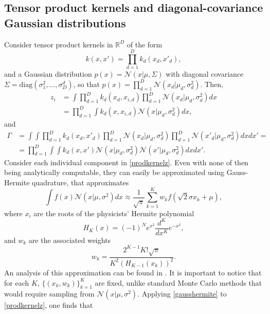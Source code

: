\subsection{Tensor product kernels and diagonal-covariance Gaussian distributions}\label{tensorprodbmc}
Consider tensor product kernels in $\mathbb{R}^D$ of the form
\begin{equation}
 k(x,x') = \prod_{d=1}^D k_d(x_d,x'_d),
\end{equation}
and a Gaussian distribution $p(x) = \mathcal{N}(x|\mu,\Sigma)$ with diagonal covariance $\Sigma = \text{diag}(\sigma_1^2,\ldots,\sigma_D^{d})$, so that $p(x) = \prod_{d=1}^D \mathcal{N}(x_d|\mu_d,\sigma_d^2)$. Then, 
\begin{equation}\label{prodkernelz}
\begin{split}
 z_i & = \int \prod_{d=1}^D k_d(x_d,x_{i,d}) \prod_{d=1}^D \mathcal{N}(x_d|\mu_d,\sigma_d^2) dx \\
 & = \prod_{d=1}^D \int k_d(x,x_{i,d}) \mathcal{N}(x|\mu_d,\sigma_d^2) dx,
\end{split}
\end{equation}
and 
\begin{equation}\label{prodkernelgamma}
\begin{split}
 \Gamma & = \int \int \prod_{d=1}^D k_d(x_d,x'_d) \prod_{d=1}^D \mathcal{N}(x_d|\mu_d,\sigma_d^2) \prod_{d=1}^D \mathcal{N}(x'_d|\mu_d,\sigma_d^2) dx dx' = \\
 & = \prod_{d=1}^D \int \int k_d(x,x')\mathcal{N}(x|\mu_d,\sigma_d^2)\mathcal{N}(x'|\mu_d,\sigma_d^2) dx dx'.
\end{split}
\end{equation}
Consider each individual component in \eqref{prodkernelz}. Even with none of then being analytically computable, they can easily be approximated using Gauss-Hermite quadrature, that approximates 
\begin{equation}\label{gausshermite}
\int f(x) \mathcal{N}(x|\mu,\sigma^2) dx \approx \frac{1}{\sqrt{\pi}} \sum_{k=1}^K w_k f(\sqrt{2} \sigma x_k + \mu),
\end{equation}
where $x_i$ are the roots of the physicists' Hermite polynomial
\begin{equation}
 H_K(x) = (-1)^N e^{x^2} \frac{d^K}{dx^K} e^{-x^2},
\end{equation}
and $w_k$ are the associated weights
\begin{equation}
 w_k = \frac{2^{K-1} K! \sqrt{\pi}}{K^2 (H_{K-1}(x_k))^2}.
\end{equation}
An analysis of this approximation can be found in \cite{Liu_1994}. It is important to notice that for each $K$, $\{(x_k,w_k)\}_{k=1}^K$ are fixed, unlike standard Monte Carlo methods that would require sampling from $\mathcal{N}(x|\mu,\sigma^2)$. Applying \eqref{gausshermite} to \eqref{prodkernelz}, one finds that

